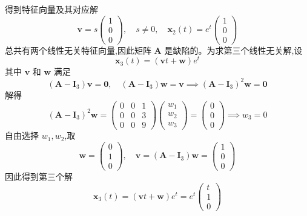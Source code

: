 \begin{questions}
\begin{solution}
\[        \]
        得到特征向量及其对应解
        \[
        \boldsymbol{v} = s \begin{pmatrix} 1 \\ 0 \\ 0 \end{pmatrix}, \quad s \neq 0, \quad \boldsymbol{x}_2(t) = e^t \begin{pmatrix} 1 \\ 0 \\ 0 \end{pmatrix}
        \]
        总共有两个线性无关特征向量,因此矩阵 $\boldsymbol{A}$ 是缺陷的。为求第三个线性无关解,设
        \[
        \boldsymbol{x}_3(t) = (\boldsymbol{v} t + \boldsymbol{w}) e^t
        \]
        其中 $\boldsymbol{v}$ 和 $\boldsymbol{w}$ 满足
        \[
        (\boldsymbol{A} - \boldsymbol{I}_3) \boldsymbol{v} = \boldsymbol{0}, \quad (\boldsymbol{A} - \boldsymbol{I}_3) \boldsymbol{w} = \boldsymbol{v} \implies (\boldsymbol{A} - \boldsymbol{I}_3)^2 \boldsymbol{w} = \boldsymbol{0}
        \]
        解得
        \[
        (\boldsymbol{A} - \boldsymbol{I}_3)^2 \boldsymbol{w} = \begin{pmatrix} 0 & 0 & 1 \\ 0 & 0 & 3 \\ 0 & 0 & 9 \end{pmatrix} \begin{pmatrix} w_1 \\ w_2 \\ w_3 \end{pmatrix} = \begin{pmatrix}0\\0\\0\end{pmatrix} \implies w_3 = 0
        \]
        自由选择 $w_1, w_2$,取
        \[
        \boldsymbol{w} = \begin{pmatrix} 0 \\ 1 \\ 0 \end{pmatrix}, \quad \boldsymbol{v} = (\boldsymbol{A} - \boldsymbol{I}_3) \boldsymbol{w} = \begin{pmatrix} 1 \\ 0 \\ 0 \end{pmatrix}
        \]
        因此得到第三个解
        \[
        \boldsymbol{x}_3(t) = (\boldsymbol{v} t + \boldsymbol{w}) e^t = e^t \begin{pmatrix} t \\ 1 \\ 0 \end{pmatrix}
\]
\end{solution}
\end{questions}
